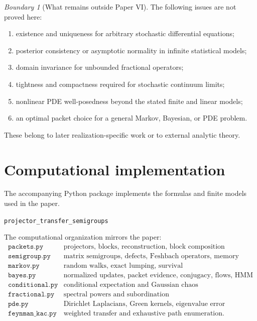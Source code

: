 \documentclass[11pt]{article}
\theoremstyle{definition}
\theoremstyle{remark}
\newtheorem{boundary}[theorem]{Boundary}
\begin{document}
\begin{boundary}[What remains outside Paper VI]
The following issues are not proved here:
\begin{enumerate}[leftmargin=2em]
\item existence and uniqueness for arbitrary stochastic differential equations;
\item posterior consistency or asymptotic normality in infinite statistical models;
\item domain invariance for unbounded fractional operators;
\item tightness and compactness required for stochastic continuum limits;
\item nonlinear PDE well-posedness beyond the stated finite and linear models;
\item an optimal packet choice for a general Markov, Bayesian, or PDE problem.
\end{enumerate}
These belong to later realization-specific work or to external analytic theory.
\end{boundary}

\section{Computational implementation}

The accompanying Python package implements the formulas and finite models used in the paper.
\begin{center}
\texttt{projector\_transfer\_semigroups}
\end{center}
The computational organization mirrors the paper:
\[
\begin{array}{c|l}
\texttt{packets.py} & \text{projectors, blocks, reconstruction, block composition}\\
\texttt{semigroup.py} & \text{matrix semigroups, defects, Feshbach operators, memory}\\
\texttt{markov.py} & \text{random walks, exact lumping, survival}\\
\texttt{bayes.py} & \text{normalized updates, packet evidence, conjugacy, flows, HMM}\\
\texttt{conditional.py} & \text{conditional expectation and Gaussian chaos}\\
\texttt{fractional.py} & \text{spectral powers and subordination}\\
\texttt{pde.py} & \text{Dirichlet Laplacians, Green kernels, eigenvalue error}\\
\texttt{feynman\_kac.py} & \text{weighted transfer and exhaustive path enumeration}.
\end{array}
\]
\end{document}
